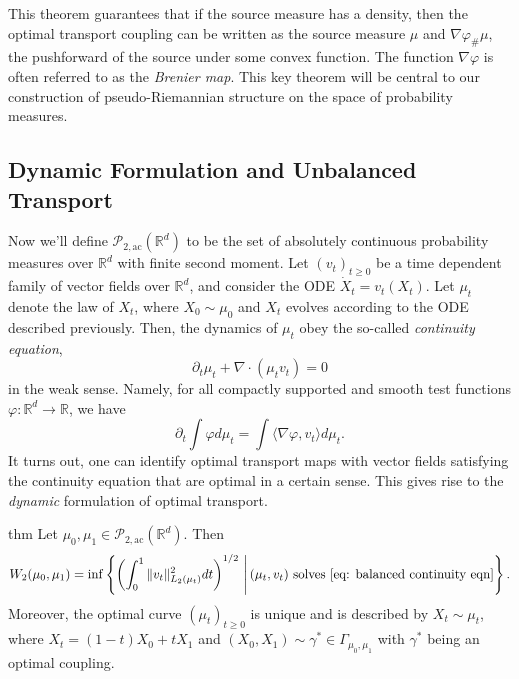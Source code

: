 \documentclass{article}
\begin{document}
This theorem guarantees that if the source measure has a density, then the optimal transport coupling can be written as the source measure $\mu$ and $\nabla \varphi_\#\mu$, the pushforward of the source under some convex function. The function $\nabla\varphi$ is often referred to as the \textit{Brenier map}. This key theorem will be central to our construction of pseudo-Riemannian structure on the space of probability measures. 

\subsection{Dynamic Formulation and Unbalanced Transport}

Now we'll define $\mathcal{P}_{2, \text{ac}}(\mathbb{R}^d)$ to be the set of absolutely continuous probability measures over $\mathbb{R}^d$ with finite second moment. Let $(v_t)_{t \geq 0}$ be a time dependent family of vector fields over $\mathbb{R}^d$, and consider the ODE $\dot X_t = v_t(X_t)$. Let $\mu_t$ denote the law of $X_t$, where $X_0 \sim \mu_0$ and $X_t$ evolves according to the ODE described previously. Then, the dynamics of $\mu_t$ obey the so-called \textit{continuity equation},
\begin{equation}
    \partial_t\mu_t + \nabla \cdot (\mu_t v_t) = 0 \label{eq: balanced continuity eqn}
\end{equation}
in the weak sense. Namely, for all compactly supported and smooth test functions $\varphi: \mathbb{R}^d \rightarrow \mathbb{R}$, we have
\[\partial_t \int \varphi d\mu_t = \int \langle \nabla \varphi, v_t\rangle d\mu_t.\]
It turns out, one can identify optimal transport maps with vector fields satisfying the continuity equation that are optimal in a certain sense. This gives rise to the \textit{dynamic} formulation of optimal transport.

\begin{restatable}{thm}{}
    Let $\mu_0, \mu_1 \in \mathcal{P}_{2, \text{ac}}(\mathbb{R}^d)$. Then 
    \begin{equation*}
        W_2(\mu_0, \mu_1) = \inf \left\{\left(\int_{0}^1\|v_t\|^2_{L_2(\mu_t)} dt\right)^{1/2} \, \Bigg| \, (\mu_t, v_t) \text{ solves \cref{eq: balanced continuity eqn}}\right\}.
    \end{equation*}
    Moreover, the optimal curve $(\mu_t)_{t\geq 0}$ is unique and is described by $X_t \sim \mu_t$, where $X_t = (1-t)X_0 + tX_1$ and $(X_0, X_1) \sim \gamma^* \in \Gamma_{\mu_0, \mu_1}$ with $\gamma^*$ being an optimal coupling.
\end{restatable}
\end{document}
